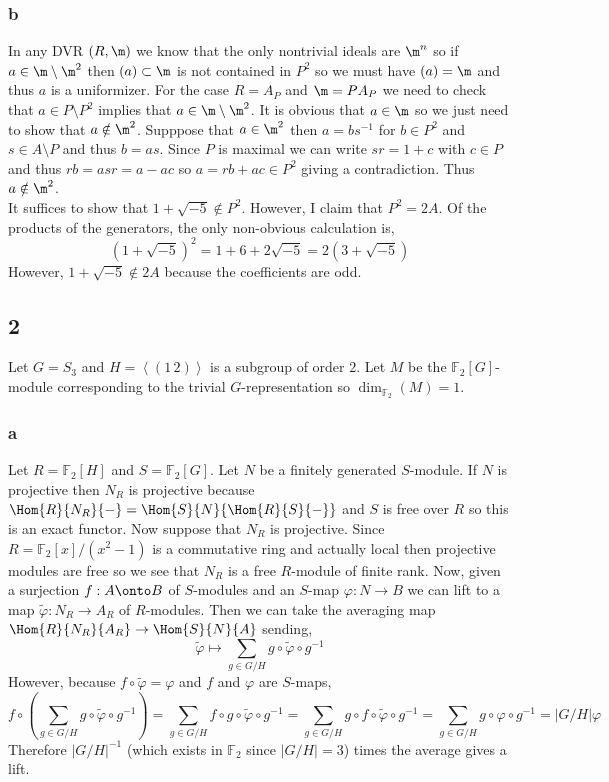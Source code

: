 \documentclass[12pt]{article}
\renewcommand{\F}{\mathbb{F}}
\begin{document}
\subsubsection{b}

In any DVR $(R, \m)$ we know that the only nontrivial ideals are $\m^n$ so if $a \in \m \setminus \m^2$ then $(a) \subset \m$ is not contained in $P^2$ so we must have $(a) = \m$ and thus $a$ is a uniformizer. For the case $R = A_P$ and $\m = P A_P$ we need to check that $a \in P \setminus P^2$ implies that $a \in \m \setminus \m^2$. It is obvious that $a \in \m$ so we just need to show that $a \notin \m^2$. Supppose that $a \in \m^2$ then $a = b s^{-1}$ for $b \in P^2$ and $s \in A \setminus P$ and thus $b = a s$. Since $P$ is maximal we can write $sr = 1 + c$ with $c \in P$ and thus $r b = a sr = a - ac$ so $a = rb + ac \in P^2$ giving a contradiction. Thus $a \notin \m^2$.
\bigskip\\
It suffices to show that $1 + \sqrt{-5} \notin P^2$. However, I claim that $P^2 = 2 A$. Of the products of the generators, the only non-obvious calculation is,
\[ ( 1 + \sqrt{-5})^2 = 1 + 6 + 2 \sqrt{-5} = 2(3 + \sqrt{-5}) \]
However, $1 + \sqrt{-5} \notin 2 A$ because the coefficients are odd.

\subsection{2}

Let $G = S_3$ and $H = \left< (1 \, 2) \right>$ is a subgroup of order $2$. Let $M$ be the $\F_2[G]$-module corresponding to the trivial $G$-representation so $\dim_{\F_2}(M) = 1$.

\subsubsection{a}

Let $R = \F_2[H]$ and $S = \F_2[G]$. Let $N$ be a finitely generated $S$-module. If $N$ is projective then $N_R$ is projective because $\Hom{R}{N_R}{-} = \Hom{S}{N}{\Hom{R}{S}{-}}$ and $S$ is free over $R$ so this is an exact functor. Now suppose that $N_R$ is projective. Since $R = \F_2[x]/(x^2 - 1)$ is a commutative ring and actually local then projective modules are free so we see that $N_R$ is a free $R$-module of finite rank. Now, given a surjection $f : A \onto B$ of $S$-modules and an $S$-map $\varphi : N \to B$ we can lift to a map $\tilde{\varphi} : N_R \to A_R$ of $R$-modules. Then we can take the averaging map $\Hom{R}{N_R}{A_R} \to \Hom{S}{N}{A}$ sending,
\[ \tilde{\varphi} \mapsto \sum_{g \in G / H} g \circ \tilde{\varphi} \circ g^{-1} \]
However, because $f \circ \tilde{\varphi} = \varphi$ and $f$ and $\varphi$ are $S$-maps,
\[ f \circ \left( \sum_{g \in G / H} g \circ \tilde{\varphi} \circ g^{-1} \right) = \sum_{g \in G / H} f \circ g \circ \tilde{\varphi} \circ g^{-1} = \sum_{g \in G / H} g \circ f \circ \tilde{\varphi} \circ g^{-1} = \sum_{g \in G / H} g \circ \varphi \circ g^{-1} = |G/H| \varphi \]
Therefore $|G/H|^{-1}$ (which exists in $\F_2$ since $|G/H| = 3$) times the average gives a lift.
\end{document}

